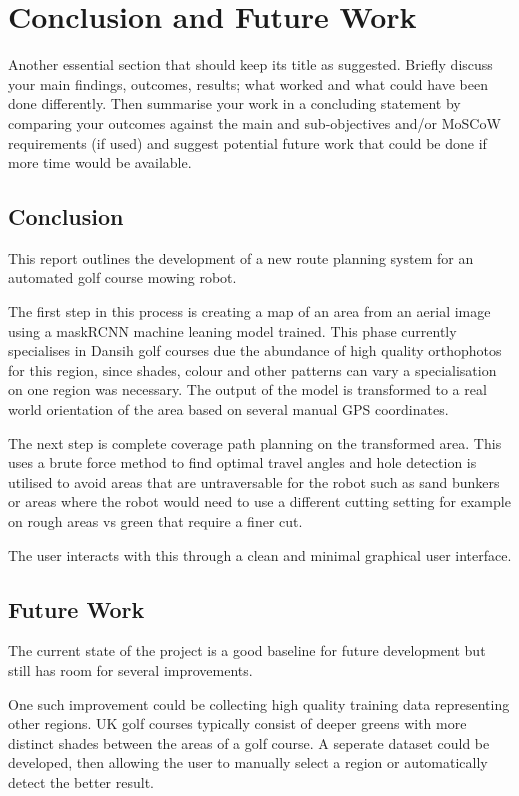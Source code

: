 \documentclass[final]{cmpreport_02}
\begin{document}
\section{Conclusion and Future Work}


Another essential section that should keep its title as suggested. Briefly discuss your main findings, outcomes, results; what worked and what could have been done differently. Then summarise your work in a concluding statement by comparing your outcomes against the main and sub-objectives and/or MoSCoW requirements (if used) and suggest potential future work that could be done if more time would be available.

\subsection{Conclusion}
This report outlines the development of a new route planning system for an automated golf course mowing robot. 

The first step in this process is creating a map of an area from an aerial image using a maskRCNN machine leaning model trained.
This phase currently specialises in Dansih golf courses due the abundance of high quality orthophotos for this region, since shades, colour and other patterns can vary a specialisation on one region was necessary.
The output of the model is transformed to a real world orientation of the area based on several manual GPS coordinates.

The next step is complete coverage path planning on the transformed area.
This uses a brute force method to find optimal travel angles and hole detection is utilised to avoid areas that are untraversable for the robot such as sand bunkers or areas where the robot would need to use a different cutting setting for example on rough areas vs green that require a finer cut.

The user interacts with this through a clean and minimal graphical user interface.


\subsection{Future Work}

The current state of the project is a good baseline for future development but still has room for several improvements.

One such improvement could be collecting high quality training data representing other regions. UK golf courses typically consist of deeper greens with more distinct shades between the areas of a golf course. A seperate dataset could be developed, then allowing the user to manually select a region or automatically detect the better result.
\end{document}
